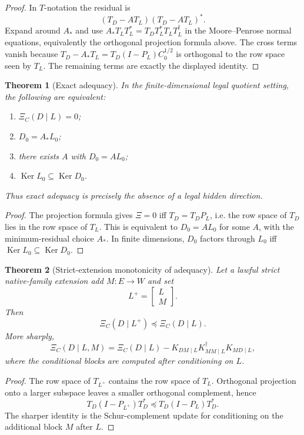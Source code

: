 \documentclass[11pt]{article}
\newtheorem{theorem}{Theorem}[section]
\DeclareMathOperator{\Ker}{Ker}
\newcommand{\XiR}{\Xi}
\newcommand{\Loewner}{\preceq}
\begin{document}
\begin{proof}
In $T$-notation the residual is
\[
  (T_D-AT_L)(T_D-AT_L)^*.
\]
Expand around $A_*$ and use $A_*T_LT_L^*=T_DT_L^*T_L T_L^\dagger$ in the Moore--Penrose normal equations, equivalently the orthogonal projection formula above.  The cross terms vanish because $T_D-A_*T_L=T_D(I-P_L)C_0^{1/2}$ is orthogonal to the row space seen by $T_L$.  The remaining terms are exactly the displayed identity.
\end{proof}

\begin{theorem}[Exact adequacy]
In the finite-dimensional legal quotient setting, the following are equivalent:
\begin{enumerate}[label=(\roman*)]
  \item $\XiR_C(D\mid L)=0$;
  \item $D_0=A_*L_0$;
  \item there exists $A$ with $D_0=AL_0$;
  \item $\Ker L_0\subseteq\Ker D_0$.
\end{enumerate}
Thus exact adequacy is precisely the absence of a legal hidden direction.
\end{theorem}

\begin{proof}
The projection formula gives $\XiR=0$ iff $T_D=T_DP_L$, i.e. the row space of $T_D$ lies in the row space of $T_L$.  This is equivalent to $D_0=A L_0$ for some $A$, with the minimum-residual choice $A_*$.  In finite dimensions, $D_0$ factors through $L_0$ iff $\Ker L_0\subseteq\Ker D_0$.
\end{proof}

\begin{theorem}[Strict-extension monotonicity of adequacy]
Let a lawful strict native-family extension add $M:E\to W$ and set
\[
  L^+=\begin{bmatrix}L\\M\end{bmatrix}.
\]
Then
\[
  \boxed{\XiR_C(D\mid L^+)\Loewner\XiR_C(D\mid L).}
\]
More sharply,
\[
  \XiR_C(D\mid L,M)=\XiR_C(D\mid L)-K_{DM\mid L}K_{MM\mid L}^\dagger K_{MD\mid L},
\]
where the conditional blocks are computed after conditioning on $L$.
\end{theorem}

\begin{proof}
The row space of $T_{L^+}$ contains the row space of $T_L$.  Orthogonal projection onto a larger subspace leaves a smaller orthogonal complement, hence
\[
  T_D(I-P_{L^+})T_D^*\Loewner T_D(I-P_L)T_D^*.
\]
The sharper identity is the Schur-complement update for conditioning on the additional block $M$ after $L$.
\end{proof}
\end{document}
